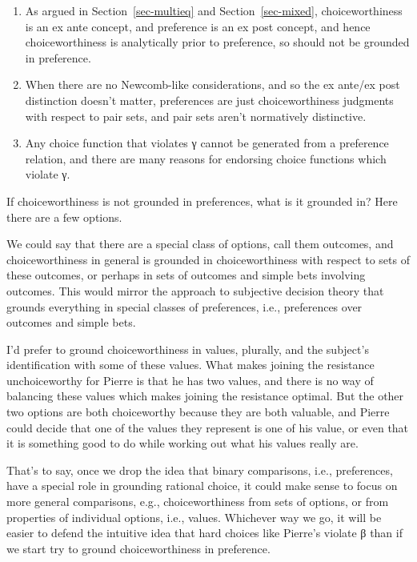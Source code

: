 \documentclass[
  11pt,
  letterpaper,
  DIV=11,
  numbers=noendperiod,
  twoside]{scrartcl}
\providecommand{\tightlist}{%
  \setlength{\itemsep}{0pt}\setlength{\parskip}{0pt}}
\begin{document}
\begin{enumerate}
\def\labelenumi{\arabic{enumi}.}
\tightlist
\item
  As argued in Section~\ref{sec-multieq} and Section~\ref{sec-mixed},
  choiceworthiness is an ex ante concept, and preference is an ex post
  concept, and hence choiceworthiness is analytically prior to
  preference, so should not be grounded in preference.
\item
  When there are no Newcomb-like considerations, and so the ex ante/ex
  post distinction doesn't matter, preferences are just choiceworthiness
  judgments with respect to pair sets, and pair sets aren't normatively
  distinctive.
\item
  Any choice function that violates γ cannot be generated from a
  preference relation, and there are many reasons for endorsing choice
  functions which violate γ.
\end{enumerate}

If choiceworthiness is not grounded in preferences, what is it grounded
in? Here there are a few options.

We could say that there are a special class of options, call them
outcomes, and choiceworthiness in general is grounded in
choiceworthiness with respect to sets of these outcomes, or perhaps in
sets of outcomes and simple bets involving outcomes. This would mirror
the approach to subjective decision theory that grounds everything in
special classes of preferences, i.e., preferences over outcomes and
simple bets.

I'd prefer to ground choiceworthiness in values, plurally, and the
subject's identification with some of these values. What makes joining
the resistance unchoiceworthy for Pierre is that he has two values, and
there is no way of balancing these values which makes joining the
resistance optimal. But the other two options are both choiceworthy
because they are both valuable, and Pierre could decide that one of the
values they represent is one of his value, or even that it is something
good to do while working out what his values really are.

That's to say, once we drop the idea that binary comparisons, i.e.,
preferences, have a special role in grounding rational choice, it could
make sense to focus on more general comparisons, e.g., choiceworthiness
from sets of options, or from properties of individual options, i.e.,
values. Whichever way we go, it will be easier to defend the intuitive
idea that hard choices like Pierre's violate β than if we start try to
ground choiceworthiness in preference.
\end{document}

